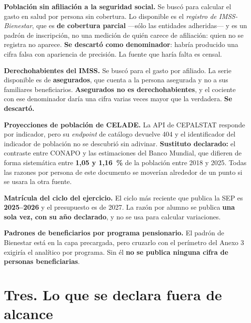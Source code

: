 \begin{list}{}{\setlength{\leftmargin}{1.4em}\setlength{\itemsep}{4pt}}
\item[$\bullet$] \textbf{Población sin afiliación a la seguridad social.} Se buscó para
calcular el gasto en salud por persona sin cobertura. Lo disponible es el \emph{registro de
IMSS-Bienestar}, que es \textbf{de cobertura parcial} ---sólo las entidades adheridas--- y es
un padrón de inscripción, no una medición de quién carece de afiliación: quien no se registra
no aparece. \textbf{Se descartó como denominador}: habría producido una cifra falsa con
apariencia de precisión. La fuente que haría falta es censal.
\item[$\bullet$] \textbf{Derechohabientes del IMSS.} Se buscó para el gasto por afiliado. La
serie disponible es de \textbf{asegurados}, que cuenta a la persona asegurada y no a sus
familiares beneficiarios. \textbf{Asegurados no es derechohabientes}, y el cociente con ese
denominador daría una cifra varias veces mayor que la verdadera. \textbf{Se descartó.}
\item[$\bullet$] \textbf{Proyecciones de población de CELADE.} La API de CEPALSTAT responde
por indicador, pero su \emph{endpoint} de catálogo devuelve 404 y el identificador del
indicador de población no se descubrió sin adivinar. \textbf{Sustituto declarado:} el
contraste entre CONAPO y las estimaciones del Banco Mundial, que difieren de forma
sistemática entre \textbf{1,05 y 1,16~\%} de la población entre 2018 y 2025. Todas las
razones por persona de este documento se moverían alrededor de un punto si se usara la otra
fuente.
\item[$\bullet$] \textbf{Matrícula del ciclo del ejercicio.} El ciclo más reciente que
publica la SEP es \textbf{2025--2026} y el presupuesto es de 2027. La razón por alumno se
publica \textbf{una sola vez, con su año declarado}, y no se usa para calcular variaciones.
\item[$\bullet$] \textbf{Padrones de beneficiarios por programa pensionario.} El padrón de
Bienestar está en la capa precargada, pero cruzarlo con el perímetro del Anexo 3 exigiría el
analítico por programa. Sin él \textbf{no se publica ninguna cifra de personas
beneficiarias}.
\end{list}

\section*{Tres. Lo que se declara fuera de alcance}

